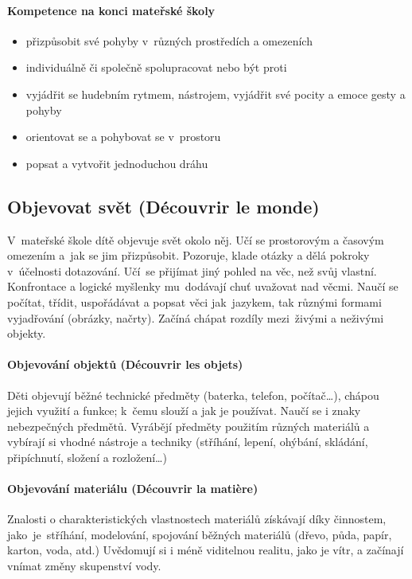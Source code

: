 				\paragraph{Kompetence na konci mateřské školy}

				\begin{itemize}
				\item přizpůsobit své pohyby v různých prostředích a omezeních
				\item individuálně či společně spolupracovat nebo být proti
				\item vyjádřit se hudebním rytmem, nástrojem, vyjádřit své pocity a emoce gesty a pohyby
				\item orientovat se a pohybovat se v prostoru
				\item popsat a vytvořit jednoduchou dráhu
				\end{itemize}

		\subsection{Objevovat svět (Découvrir le monde)}
			V mateřské škole dítě objevuje svět okolo něj. Učí se prostorovým a časovým omezením a jak se jim přizpůsobit. Pozoruje, klade otázky a dělá pokroky v účelnosti dotazování. Učí se přijímat jiný pohled na věc, než svůj vlastní.  Konfrontace a logické myšlenky mu dodávají chuť uvažovat nad věcmi. Naučí se počítat, třídit, uspořádávat a popsat věci jak jazykem, tak různými formami vyjadřování (obrázky, načrty). Začíná chápat rozdíly mezi živými a neživými objekty.

			\paragraph{Objevování objektů (Découvrir les objets)}
				Děti objevují běžné technické předměty (baterka, telefon, počítač…), chápou jejich využití a funkce; k čemu slouží a jak je používat. Naučí se i znaky nebezpečných předmětů.
				Vyrábějí předměty použitím různých materiálů a vybírají si vhodné nástroje a techniky (stříhání, lepení, ohýbání, skládání, připíchnutí, složení a rozložení…)
			\paragraph{Objevování materiálu (Découvrir la matière)}
				Znalosti o charakteristických vlastnostech materiálů získávají díky činnostem, jako je stříhání, modelování, spojování běžných materiálů (dřevo, půda, papír, karton, voda, atd.)
				Uvědomují si i méně viditelnou realitu, jako je vítr, a začínají vnímat změny skupenství vody. 

